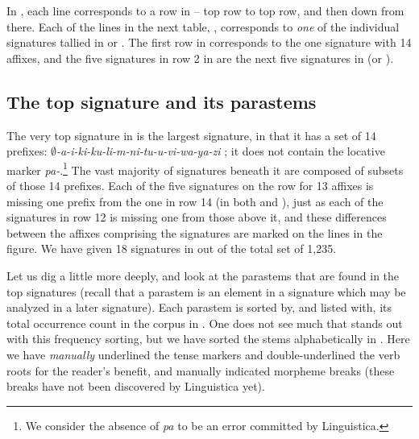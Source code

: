 \documentclass[output=paper,colorlinks,citecolor=brown]{langscibook}
\begin{document}
In ,  each line corresponds to a row in  -- top row to top row, and then down from there. Each of the lines in the next table, , corresponds to \textit{one} of the individual signatures tallied in  or . The first row in  corresponds to the one signature with 14 affixes, and the five signatures in row 2 in  are the next five signatures in  (or ). 

\subsection{The top signature and its parastems}
The very top signature in  is the largest signature, in that it has a  set of 14 prefixes: \textit{$\emptyset$-a-i-ki-ku-li-m-ni-tu-u-vi-wa-ya-zi} ; it does not contain the locative marker \textit{pa-}.\footnote{We consider the absence of \textit{pa} to be an error committed by Linguistica.} The vast majority of signatures beneath it are composed of subsets of those 14 prefixes. Each of the five signatures on the row for 13 affixes is missing one prefix from the one in row 14 (in both  and ), just as each of the signatures in row 12 is missing one from those above it, and these differences between the affixes comprising the signatures are marked on the lines in the figure. We have given 18 signatures in  out of the total set of 1,235. 
 
Let us dig a little more deeply, and look at the parastems that are found in the top signatures (recall that a parastem is an element in a signature which may be analyzed in a later signature). Each parastem is sorted by, and listed with, its total occurrence count in the corpus in . One does not see much that stands out with this frequency sorting, but we have sorted the stems alphabetically in . Here we have \textit{manually} underlined the tense markers and double-underlined the verb roots for the reader's benefit, and manually indicated morpheme breaks (these breaks have not been discovered by Linguistica yet). 
  
  
\end{document}
